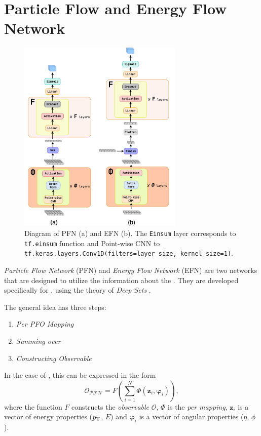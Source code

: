 \section{Particle Flow and Energy Flow Network}
\label{sec:pfn_efn}

\begin{figure}[htb]
    \centering
    \includegraphics[width=0.7\textwidth]{src/diagrams/pfn_efn.png}
    \caption{Diagram of PFN (a) and EFN (b). The \texttt{Einsum} layer corresponds to \texttt{tf.einsum} function and Point-wise CNN to \texttt{tf.keras.layers.Conv1D(filters=layer\_size, kernel\_size=1)}.}
    \label{fig:pfn_efn}
\end{figure}

\emph{Particle Flow Network} (PFN) and \emph{Energy Flow Network} (EFN) \cite{efn} are two networks that are designed to utilize the information about the \PFOs.
They are developed specifically for \HEP, using the theory of \emph{Deep Sets} \cite{deep_set}.

The general idea has three steps:
\begin{enumerate}
    \item \emph{Per PFO Mapping}   
    \item \emph{Summing over \PFOs} 
    \item \emph{Constructing Observable}
\end{enumerate}

In the case of \PFN, this can be expressed in the form 
\begin{equation}
    \label{eq:pfn}
  \mathcal{O_{\text{PFN}}} = F\left(\sum_{i=1}^N \Phi(\pmb{z}_i, \pmb{\varphi}_i )\right), 
\end{equation}  
where the function $F$ constructs the \emph{observable} $\mathcal{O}$, $\Phi$ is the \emph{per \PFO mapping}, $\pmb{z}_i$ is a vector of \PFO energy properties ($p_\text{T}$, $E$) and $\pmb{\varphi}_i$ is a vector of \PFO angular properties ($\eta$, $\phi$).


